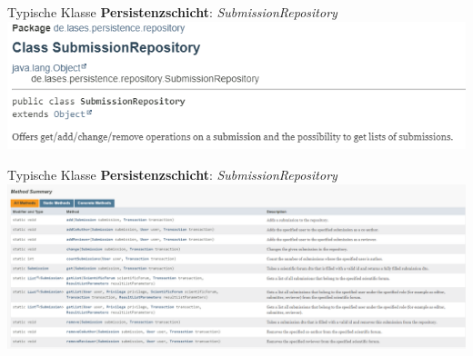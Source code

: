 \documentclass{beamer}
\begin{document}
    \begin{frame}{Typische Klasse \textbf{Persistenzschicht}: \emph{SubmissionRepository}}
        \centering
        \includegraphics[height=0.3\textheight]{graphics/repo/doc_repo}
    \end{frame}
    \begin{frame}{Typische Klasse \textbf{Persistenzschicht}: \emph{SubmissionRepository}}
        \centering
        \includegraphics[height=0.5\textheight]{graphics/repo/doc_static}
    \end{frame}
\end{document}
